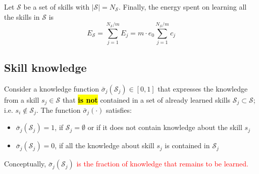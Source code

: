 Let $\mathcal{S}$ be a set of skills with $|\mathcal{S}| = N_\mathcal{S}$. Finally, the energy spent on learning all the skills in $\mathcal{S}$ is %
\begin{equation}\label{eq:total_energy}
    E_{\mathcal{S}} = \sum_{j=1}^{{N_{\mathcal{S}}}/{m}} E_j = m \cdot e_0 \sum_{j=1}^{{N_{\mathcal{S}}}/{m}} c_j%
\end{equation}

\subsection{Skill knowledge}
Consider a knowledge function $\bar{\sigma}_j(\mathcal{S}_j)\in [0,1]$ that expresses the knowledge from a skill  $s_j \in \mathcal{S}$ that \hl{\textbf{is not}} contained in a set of already learned skills $\mathcal{S}_j \subset \mathcal{S}$; i.e. $s_i \notin \mathcal{S}_j$. The function $\bar{\sigma}_j(\cdot)$ satisfies:
\begin{itemize}
	\item $\bar{\sigma}_j(\mathcal{S}_j) = 1$, if $\mathcal{S}_j=\emptyset$ or if it does not contain knowledge about the skill $s_j$
	\item $\bar{\sigma}_j(\mathcal{S}_j) = 0$, if all the knowledge about skill $s_j$ is contained in $\mathcal{S}_j$
\end{itemize} 
Conceptually, $\bar{\sigma}_j(\mathcal{S}_j)$ \textcolor{red}{is the fraction of knowledge that remains to be learned.}
